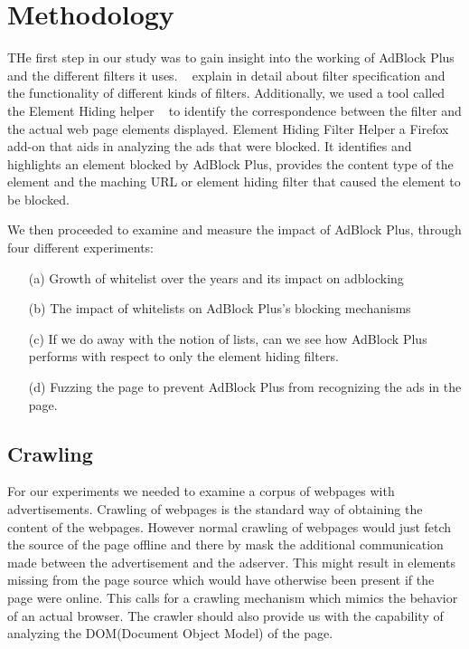 \section{Methodology}
THe first step in our study was to gain insight into the working of AdBlock Plus and the different filters it uses.
~\cite{walls2015measuring} explain in detail about filter specification and the functionality of different kinds of filters.
Additionally, we used a tool called the Element Hiding helper ~\cite{elemhidehelper}  to identify the correspondence between the filter and the actual web page elements displayed.
Element Hiding Filter Helper a Firefox add-on that aids in analyzing the ads that were blocked.
It identifies and highlights an element blocked by AdBlock Plus, provides the content type of the element and the maching URL or element hiding filter that caused the element to be blocked.

We then proceeded to examine and measure the impact of AdBlock Plus, through four different experiments:
\begin{enumerate}
	\item[(a)] Growth of whitelist over the years and its impact on adblocking
	\item[(b)] The impact of whitelists on AdBlock Plus's blocking mechanisms
    \item[(c)]If we do away with the notion of lists, can we see how AdBlock Plus performs with respect to only the element hiding filters.
    \item[(d)] Fuzzing the page to prevent AdBlock Plus from recognizing the ads in the page.

\end{enumerate}

\subsection{Crawling}
For our experiments we needed to examine a corpus of webpages with advertisements.
Crawling of webpages is the standard way of obtaining the content of the webpages.
However normal crawling of webpages would just fetch the source of the page offline and there by mask the additional communication made between the  advertisement and the adserver.
This might result in elements  missing from the page source which would have otherwise been present if the page were online.
This calls for a crawling mechanism which mimics the behavior of an actual browser.
The crawler should also provide us with the capability of analyzing the DOM(Document Object Model) of the page.

